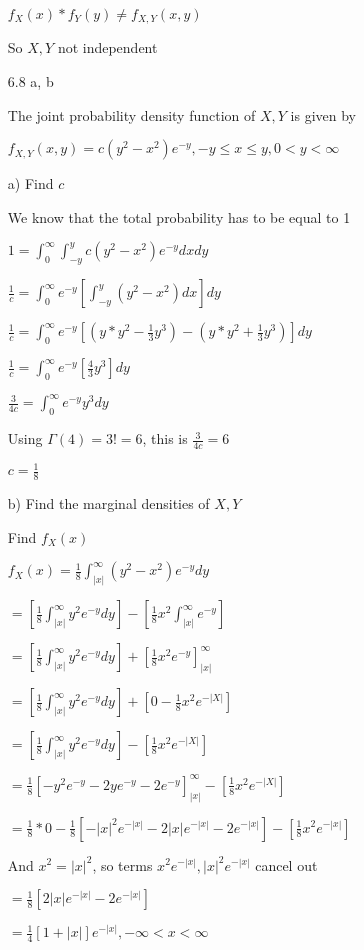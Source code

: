\documentclass[11pt]{article}
\begin{document}
\begin{itemize}
	$f_X(x) * f_Y(y) \neq f_{X,Y}(x,y)$

	So $X,Y$ not independent

\item[6.8 a, b]

	The joint probability density function of $X,Y$ is given by

	$f_{X,Y}(x,y) = c(y^2 - x^2)e^{-y},    -y \leq x \leq y, 0 < y < \infty$

	a) Find $c$

	We know that the total probability has to be equal to 1

	$1 = \int_{0}^{\infty} \int_{-y}^{y} c(y^2 - x^2)e^{-y} dx dy$

	$\frac{1}{c} = \int_{0}^{\infty} e^{-y} [ \int_{-y}^{y} (y^2 - x^2) dx] dy$

	$ \frac{1}{c} = \int_{0}^{\infty} e^{-y} [(y*y^2 - \frac{1}{3}y^3) - (y*y^2 + \frac{1}{3}y^3)] dy$


	$ \frac{1}{c} = \int_{0}^{\infty} e^{-y} [\frac{4}{3}y^3]dy$

	$ \frac{3}{4c} = \int_{0}^{\infty} e^{-y} y^3 dy$

	Using $\Gamma(4) = 3! = 6$, this is $\frac{3}{4c} = 6$

	$c = \frac{1}{8}$

	b) Find the marginal densities of $X,Y$
	
	Find $f_X(x)$

	$f_X(x) = \frac{1}{8} \int_{|x|}^{\infty} (y^2 - x^2) e^{-y} dy$

	$= [\frac{1}{8} \int_{|x|}^{\infty} y^2e^{-y}dy] - [\frac{1}{8}x^2 \int_{|x|}^{\infty} e^{-y}]$

	$= [\frac{1}{8} \int_{|x|}^{\infty} y^2e^{-y}dy] + [\frac{1}{8}x^2 e^{-y}]_{|x|}^{\infty}$

	$= [\frac{1}{8} \int_{|x|}^{\infty} y^2e^{-y}dy] + [0 - \frac{1}{8}x^2 e^{-|X|}]$

	$= [\frac{1}{8} \int_{|x|}^{\infty} y^2e^{-y}dy] - [\frac{1}{8}x^2 e^{-|X|}]$

	$= \frac{1}{8}[ -y^2e^{-y} - 2ye^{-y} - 2e^{-y}]_{|x|}^{\infty} - [\frac{1}{8}x^2 e^{-|X|}]$

	$= \frac{1}{8}*0 - \frac{1}{8}[-|x|^2 e^{-|x|} - 2|x|e^{-|x|} - 2e^{-|x|}] - [\frac{1}{8}x^2 e^{-|x|}]$

	And $x^2 = |x|^2$, so terms $x^2e^{-|x|}, |x|^2 e^{-|x|}$ cancel out

	$= \frac{1}{8}[2|x|e^{-|x|} - 2e^{-|x|}]$

	$= \frac{1}{4}[1 + |x|]e^{-|x|}, -\infty < x < \infty$



\end{itemize}
\end{document}
